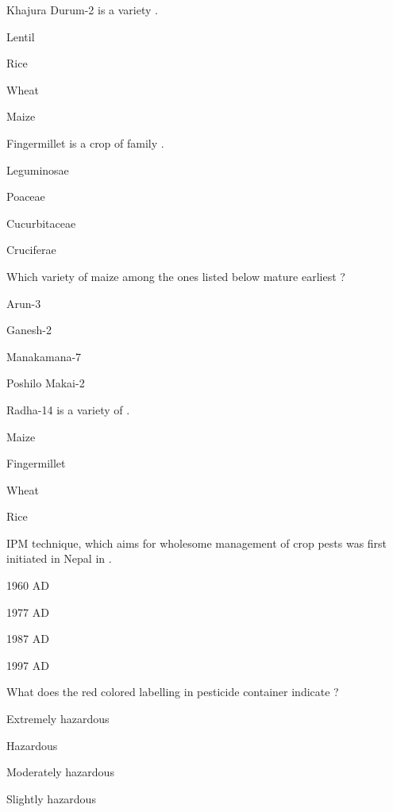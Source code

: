\begin{questions}
\question Khajura Durum-2 is a variety \fillin[][3cm].
  \begin{items}
  \item Lentil
  \item Rice
  \item* Wheat
  \item Maize
  \end{items}

\question Fingermillet is a crop of family \fillin[][3cm].
  \begin{items}
  \item Leguminosae
  \item* Poaceae
  \item Cucurbitaceae
  \item Cruciferae
  \end{items}

\question Which variety of maize among the ones listed below mature earliest ?
  \begin{items}
  \item* Arun-3
  \item Ganesh-2
  \item Manakamana-7
  \item Poshilo Makai-2
  \end{items}

\question Radha-14 is a variety of \fillin[][3cm].
  \begin{items}
  \item Maize
  \item Fingermillet
  \item Wheat
  \item* Rice
  \end{items}

\question IPM technique, which aims for wholesome management of crop pests was first initiated in Nepal in \fillin[][3cm].
  \begin{items}
  \item 1960 AD
  \item 1977 AD
  \item 1987 AD
  \item* 1997 AD
  \end{items}

\question What does the red colored labelling in pesticide container indicate ?
  \begin{items}
  \item* Extremely hazardous
  \item Hazardous
  \item Moderately hazardous
  \item Slightly hazardous
  \end{items}


\end{questions}
